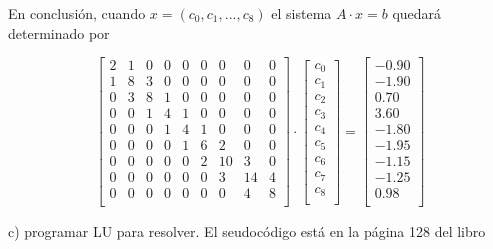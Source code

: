 En conclusión, cuando $x = (c_0, c_1, ... , c_8)$ el sistema $A\cdot x=b$ quedará determinado por

\begin{equation}
    \begin{bmatrix}
    2 & 1 & 0 & 0 & 0 & 0 & 0 & 0 & 0 \\
    1 & 8 & 3 & 0 & 0 & 0 & 0 & 0 & 0 \\
    0 & 3 & 8 & 1 & 0 & 0 & 0 & 0 & 0 \\
    0 & 0 & 1 & 4 & 1 & 0 & 0 & 0 & 0 \\
    0 & 0 & 0 & 1 & 4 & 1 & 0 & 0 & 0 \\
    0 & 0 & 0 & 0 & 1 & 6 & 2 & 0 & 0 \\
    0 & 0 & 0 & 0 & 0 & 2 & 10 & 3 & 0 \\
    0 & 0 & 0 & 0 & 0 & 0 & 3 & 14 & 4 \\
    0 & 0 & 0 & 0 & 0 & 0 & 0 & 4 & 8 \\
    \end{bmatrix}
    \cdot
    \begin{bmatrix}
    c_0 \\
    c_1 \\
    c_2 \\
    c_3 \\
    c_4 \\
    c_5 \\
    c_6 \\
    c_7 \\
    c_8 \\
    \end{bmatrix}
    =
    \begin{bmatrix}
    -0.90 \\
    -1.90 \\
    0.70 \\
    3.60 \\
    -1.80 \\
    -1.95 \\
    -1.15 \\
    -1.25 \\
    0.98 \\
    \end{bmatrix}
\end{equation}

c) programar LU para resolver. El seudocódigo está en la página 128 del libro \newline

